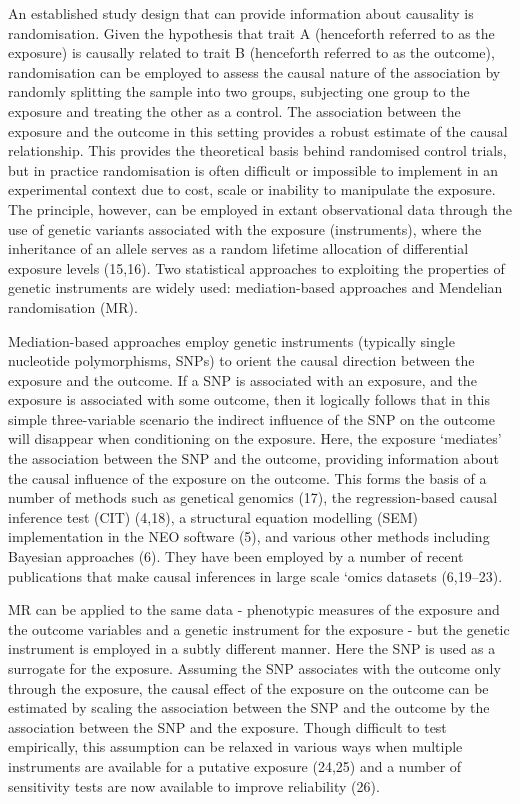 \documentclass[]{article}
\begin{document}
An established study design that can provide information about causality
is randomisation. Given the hypothesis that trait A (henceforth referred
to as the exposure) is causally related to trait B (henceforth referred
to as the outcome), randomisation can be employed to assess the causal
nature of the association by randomly splitting the sample into two
groups, subjecting one group to the exposure and treating the other as a
control. The association between the exposure and the outcome in this
setting provides a robust estimate of the causal relationship. This
provides the theoretical basis behind randomised control trials, but in
practice randomisation is often difficult or impossible to implement in
an experimental context due to cost, scale or inability to manipulate
the exposure. The principle, however, can be employed in extant
observational data through the use of genetic variants associated with
the exposure (instruments), where the inheritance of an allele serves as
a random lifetime allocation of differential exposure levels (15,16).
Two statistical approaches to exploiting the properties of genetic
instruments are widely used: mediation-based approaches and Mendelian
randomisation (MR).

Mediation-based approaches employ genetic instruments (typically single
nucleotide polymorphisms, SNPs) to orient the causal direction between
the exposure and the outcome. If a SNP is associated with an exposure,
and the exposure is associated with some outcome, then it logically
follows that in this simple three-variable scenario the indirect
influence of the SNP on the outcome will disappear when conditioning on
the exposure. Here, the exposure `mediates' the association between the
SNP and the outcome, providing information about the causal influence of
the exposure on the outcome. This forms the basis of a number of methods
such as genetical genomics (17), the regression-based causal inference
test (CIT) (4,18), a structural equation modelling (SEM) implementation
in the NEO software (5), and various other methods including Bayesian
approaches (6). They have been employed by a number of recent
publications that make causal inferences in large scale `omics datasets
(6,19--23).

MR can be applied to the same data - phenotypic measures of the exposure
and the outcome variables and a genetic instrument for the exposure -
but the genetic instrument is employed in a subtly different manner.
Here the SNP is used as a surrogate for the exposure. Assuming the SNP
associates with the outcome only through the exposure, the causal effect
of the exposure on the outcome can be estimated by scaling the
association between the SNP and the outcome by the association between
the SNP and the exposure. Though difficult to test empirically, this
assumption can be relaxed in various ways when multiple instruments are
available for a putative exposure (24,25) and a number of sensitivity
tests are now available to improve reliability (26).
\end{document}
